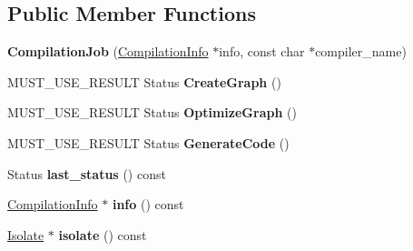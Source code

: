 \subsection*{Public Member Functions}
\begin{DoxyCompactItemize}
\item 
{\bfseries Compilation\+Job} (\hyperlink{classv8_1_1internal_1_1_compilation_info}{Compilation\+Info} $\ast$info, const char $\ast$compiler\+\_\+name)\hypertarget{classv8_1_1internal_1_1_compilation_job_a93469d10c4a6e091f55ed847910f19a9}{}\label{classv8_1_1internal_1_1_compilation_job_a93469d10c4a6e091f55ed847910f19a9}

\item 
M\+U\+S\+T\+\_\+\+U\+S\+E\+\_\+\+R\+E\+S\+U\+LT Status {\bfseries Create\+Graph} ()\hypertarget{classv8_1_1internal_1_1_compilation_job_a342eadd251806e05ec3f90194b01e779}{}\label{classv8_1_1internal_1_1_compilation_job_a342eadd251806e05ec3f90194b01e779}

\item 
M\+U\+S\+T\+\_\+\+U\+S\+E\+\_\+\+R\+E\+S\+U\+LT Status {\bfseries Optimize\+Graph} ()\hypertarget{classv8_1_1internal_1_1_compilation_job_a398ee655736decabfef8ae28da818b87}{}\label{classv8_1_1internal_1_1_compilation_job_a398ee655736decabfef8ae28da818b87}

\item 
M\+U\+S\+T\+\_\+\+U\+S\+E\+\_\+\+R\+E\+S\+U\+LT Status {\bfseries Generate\+Code} ()\hypertarget{classv8_1_1internal_1_1_compilation_job_adb21d21dd59ceea858d901a82e61f288}{}\label{classv8_1_1internal_1_1_compilation_job_adb21d21dd59ceea858d901a82e61f288}

\item 
Status {\bfseries last\+\_\+status} () const \hypertarget{classv8_1_1internal_1_1_compilation_job_a843e7bacc5f6cdeacd5cb55d317d251a}{}\label{classv8_1_1internal_1_1_compilation_job_a843e7bacc5f6cdeacd5cb55d317d251a}

\item 
\hyperlink{classv8_1_1internal_1_1_compilation_info}{Compilation\+Info} $\ast$ {\bfseries info} () const \hypertarget{classv8_1_1internal_1_1_compilation_job_a23ed223bbdc1900b023ec4abb0fbe7b1}{}\label{classv8_1_1internal_1_1_compilation_job_a23ed223bbdc1900b023ec4abb0fbe7b1}

\item 
\hyperlink{classv8_1_1internal_1_1_isolate}{Isolate} $\ast$ {\bfseries isolate} () const \hypertarget{classv8_1_1internal_1_1_compilation_job_a0674656a7947a6cd488a0c78a674cd94}{}\label{classv8_1_1internal_1_1_compilation_job_a0674656a7947a6cd488a0c78a674cd94}


\end{DoxyCompactItemize}
